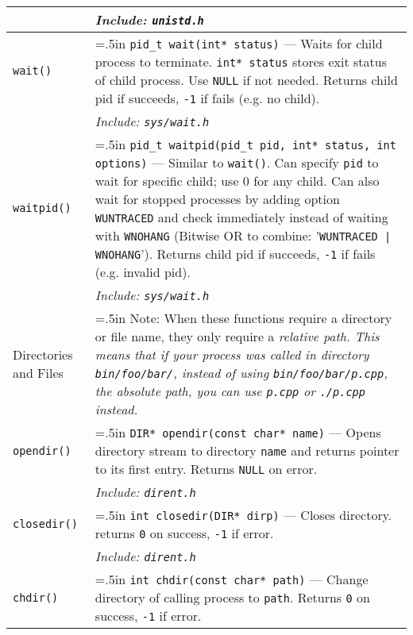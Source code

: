\documentclass{article}
\newcommand{\indenth}[1][.5]{\hangindent=#1in
                         \hangafter=1 }
\begin{document}
\begin{longtabu}{|p{.9in}|p{6.3in}<{\strut}|}
        \\
    & \hspace{.5in}\it Include: \rm\texttt{unistd.h}
        \\ \hline
    \texttt{wait()} & \indenth\texttt{pid\_t wait(int* status)} --- Waits for child process to terminate. \texttt{int* status} stores exit status of child process. Use \texttt{NULL} if not needed. Returns child pid if succeeds, \texttt{-1} if fails (e.g. no child). 
        \\
    & \hspace{.5in}\it Include: \rm\texttt{sys/wait.h}
        \\
    \texttt{waitpid()} & \indenth\texttt{pid\_t waitpid(pid\_t pid, int* status, int options)} --- Similar to \texttt{wait()}. Can specify \texttt{pid} to wait for specific child; use 0 for any child. Can also wait for stopped processes by adding option \texttt{WUNTRACED} and check immediately instead of waiting with \texttt{WNOHANG} (Bitwise OR to combine: '\texttt{WUNTRACED | WNOHANG}'). Returns child pid if succeeds, \texttt{-1} if fails (e.g. invalid pid).
        \\
    & \hspace{.5in}\it Include: \rm\texttt{sys/wait.h}
        \\ \hline
    Directories and Files & \indenth Note: When these functions require a directory or file name, they only require a \itshape relative path\rm. This means that if your process was called in directory \texttt{bin/foo/bar/}, instead of using \texttt{bin/foo/bar/p.cpp}, the \itshape absolute path\rm,  you can use \texttt{p.cpp} or \texttt{./p.cpp} instead. \par
        \\
    \texttt{opendir()} & \indenth\texttt{DIR* opendir(const char* name)} --- Opens directory stream to directory \texttt{name} and returns pointer to its first entry. Returns \texttt{NULL} on error. 
        \\
    & \hspace{.5in}\it Include: \rm\texttt{dirent.h}
        \\
    \texttt{closedir()} & \indenth\texttt{int closedir(DIR* dirp)} --- Closes  directory. returns \texttt{0} on success, \texttt{-1} if error.
        \\
    & \hspace{.5in}\it Include: \rm\texttt{dirent.h}
        \\
    \texttt{chdir()} & \indenth\texttt{int chdir(const char* path)} --- Change directory of calling process to \texttt{path}. Returns \texttt{0} on success, \texttt{-1} if error.

\end{longtabu}
\end{document}
